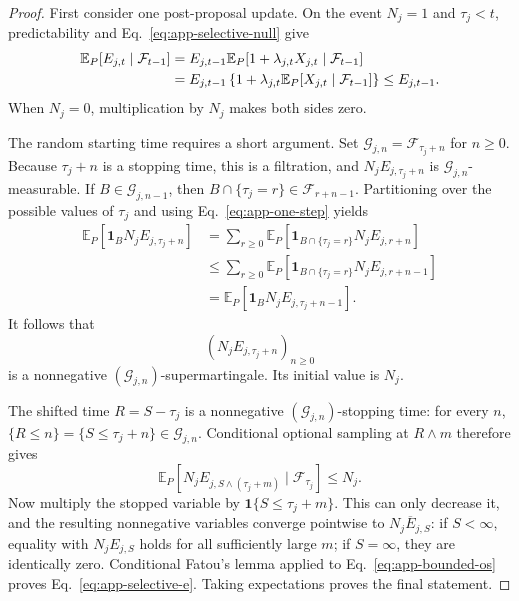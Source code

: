 \begin{proof}
First consider one post-proposal update.  On the event \(N_j=1\) and
\(\tau_j<t\), predictability and
Eq.~\eqref{eq:app-selective-null} give
\begin{align}
 \mathbb E_P[E_{j,t}\mid\mathcal F_{t-1}]
 &=E_{j,t-1}
   \mathbb E_P[1+\lambda_{j,t}X_{j,t}\mid\mathcal F_{t-1}]
 \notag\\
 &=E_{j,t-1}\left\{1+\lambda_{j,t}
   \mathbb E_P[X_{j,t}\mid\mathcal F_{t-1}]\right\}
 \leq E_{j,t-1}.
 \label{eq:app-one-step}
\end{align}
When \(N_j=0\), multiplication by \(N_j\) makes both sides zero.

The random starting time requires a short argument.  Set
\(\mathcal G_{j,n}=\mathcal F_{\tau_j+n}\) for \(n\geq0\).  Because
\(\tau_j+n\) is a stopping time, this is a filtration, and
\(N_jE_{j,\tau_j+n}\) is \(\mathcal G_{j,n}\)-measurable.  If
\(B\in\mathcal G_{j,n-1}\), then
\(B\cap\{\tau_j=r\}\in\mathcal F_{r+n-1}\).  Partitioning over the possible
values of \(\tau_j\) and using Eq.~\eqref{eq:app-one-step} yields
\begin{align*}
 \mathbb E_P[\mathbf 1_BN_jE_{j,\tau_j+n}]
 &=\sum_{r\geq0}
   \mathbb E_P[\mathbf 1_{B\cap\{\tau_j=r\}}
                    N_jE_{j,r+n}]\\
 &\leq\sum_{r\geq0}
   \mathbb E_P[\mathbf 1_{B\cap\{\tau_j=r\}}
                    N_jE_{j,r+n-1}]\\
 &=\mathbb E_P[\mathbf 1_BN_jE_{j,\tau_j+n-1}].
\end{align*}
It follows that
\[
  (N_jE_{j,\tau_j+n})_{n\geq0}
\]
is a nonnegative \((\mathcal G_{j,n})\)-supermartingale.  Its initial value
is \(N_j\).

The shifted time \(R=S-\tau_j\) is a nonnegative
\((\mathcal G_{j,n})\)-stopping time: for every \(n\),
\(\{R\leq n\}=\{S\leq\tau_j+n\}\in\mathcal G_{j,n}\).  Conditional optional
sampling at \(R\wedge m\) therefore gives
\begin{equation}
  \mathbb E_P[
    N_jE_{j,S\wedge(\tau_j+m)}\mid\mathcal F_{\tau_j}]
  \leq N_j.
  \label{eq:app-bounded-os}
\end{equation}
Now multiply the stopped variable by
\(\mathbf 1\{S\leq\tau_j+m\}\).  This can only decrease it, and the resulting
nonnegative variables converge pointwise to
\(N_j\overline E_{j,S}\): if \(S<\infty\), equality with
\(N_jE_{j,S}\) holds for all sufficiently large \(m\); if \(S=\infty\),
they are identically zero.  Conditional Fatou's lemma applied to
Eq.~\eqref{eq:app-bounded-os} proves
Eq.~\eqref{eq:app-selective-e}.  Taking expectations proves the final
statement.
\end{proof}

